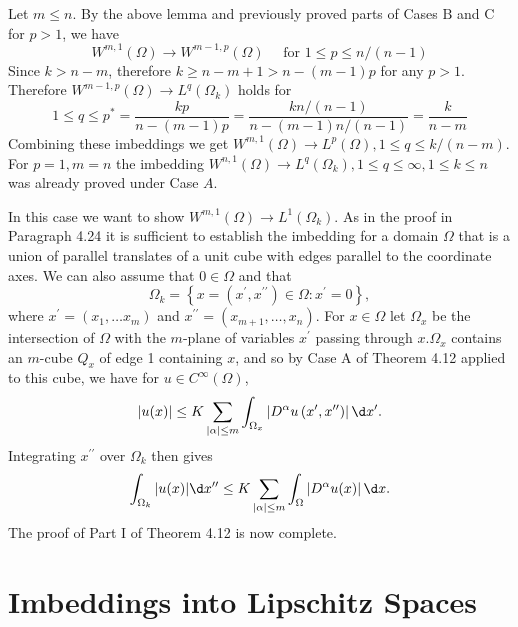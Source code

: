 \begin{para}[Proof of Part I, Cases B and C of Theorem 4.12 for $\bm{p=1}$, $\bm{k>n-m}$]
  Let $m \leq n$. By the above lemma and previously proved parts of Cases $\mathrm{B}$ and $\mathrm{C}$ for $p>1$, we have
  \[
  W^{m, 1}(\Omega) \rightarrow W^{m-1, p}(\Omega) \quad \text { for } 1 \leq p \leq n /(n-1)
  \]
  Since $k>n-m$, therefore $k \geq n-m+1>n-(m-1) p$ for any $p>1$. Therefore $W^{m-1, p}(\Omega) \rightarrow L^q(\Omega_k)$ holds for
  \[
  1 \leq q \leq p^*=\frac{k p}{n-(m-1) p}=\frac{k n /(n-1)}{n-(m-1) n /(n-1)}=\frac{k}{n-m}
  \]
  Combining these imbeddings we get $W^{m, 1}(\Omega) \rightarrow L^p(\Omega), 1 \leq q \leq k /(n-m)$.
  For $p=1, m=n$ the imbedding $W^{n, 1}(\Omega) \rightarrow L^q(\Omega_k), 1 \leq q \leq \infty, 1 \leq k \leq n$ was already proved under Case $A$.
\end{para}


\begin{para}[Proof of Part I, Case C of Theorem 4.12 for $\bm{p=1}$, $\bm{k=n-m}$]
  In this case we want to show $W^{m, 1}(\Omega) \rightarrow L^1(\Omega_k)$.
  As in the proof in Paragraph 4.24 it is sufficient to establish the imbedding for a domain 
  $\Omega$ that is a union of parallel translates of a unit cube with edges parallel to the 
  coordinate axes. We can also assume that $0 \in \Omega$ and that
  \[
  \Omega_k=\left\{x=\left(x^{\prime}, x^{\prime \prime}\right) \in \Omega: x^{\prime}=0\right\},
  \]
  where $x^{\prime}=\left(x_1, \ldots x_m\right)$ and $x^{\prime \prime}=\left(x_{m+1}, \ldots, x_n\right)$. For $x \in \Omega$ let $\Omega_x$ be the intersection of $\Omega$ with the $m$-plane of variables $x^{\prime}$ passing through $x . \Omega_x$ contains an $m$-cube $Q_x$ of edge 1 containing $x$, and so by Case A of Theorem 4.12 applied to this cube, we have for $u \in C^{\infty}(\Omega)$,
  \[
  |u(x)| \leq K \sum_{|\alpha| \leq m} \int_{\Omega_x}\left|D^\alpha u\left(x^{\prime}, x^{\prime \prime}\right)\right| \d x^{\prime} .
  \]
  Integrating $x^{\prime \prime}$ over $\Omega_k$ then gives
  \[
  \int_{\Omega_k}|u(x)| \d x^{\prime \prime} \leq K \sum_{|\alpha| \leq m} \int_{\Omega}\left|D^\alpha u(x)\right| \d x .
  \]
  The proof of Part I of Theorem 4.12 is now complete.
\end{para}


\section{Imbeddings into Lipschitz Spaces}


